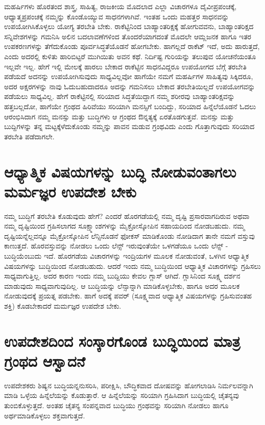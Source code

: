 ಮಹರ್ಷಿಗಳು ಹೊರತಂದ ಶಾಸ್ತ್ರ, ಸಾಹಿತ್ಯ, ರಾಜಕೀಯ ಮೊದಲಾದ ಎಲ್ಲಾ ವಿಚಾರಗಳೂ ದೈವೀಪ್ರಪಂಚಕ್ಕೆ, ಆಧ್ಯಾತ್ಮಪ್ರಪಂಚಕ್ಕೆ ನಮ್ಮನ್ನು ಕೊಂಡೊಯ್ಯುವ ಸಾಧನಗಳಾಗಿವೆ. ಇಂತಹ ಒಂದು ಮಹತ್ತರ ಸಾಧನವನ್ನು ಉಪಯೋಗಿಸಿಕೊಳ್ಳಲು ಯೋಗ್ಯ ತರಬೇತಿ ಬೇಕು. ರಾಕೆಟ್ಟಿನಿಂದ ಬಾಹ್ಯಾಂತರಿಕ್ಷಕ್ಕೆ ಹೋಗುವವನು, ಬಾಹ್ಯಾಂತರಿಕ್ಷದ ಸನ್ನಿವೇಶಗಳನ್ನು ಗಮನಿಸಿ ಅಲಿನ ಬದಲಾವಣೆಗಳಿಂದ ತೊಂದರೆಯಾಗದಂತೆ ಮೊದಲೇ ಆಮ್ಲಜನಕ ಹಾಗೂ ಇತರ ಉಪಕರಣಗಳನ್ನು ತೆಗೆದುಕೊಂಡು ಪೂರ್ವಸಿದ್ಧತೆಯೊಡನೆ ಹೋಗಬೇಕು. ಹಾಗಲ್ಲದೆ ರಾಕೆಟ್ ಇದೆ, ಅದು ಹಾರುತ್ತದೆ, ಎಂದು ಅದರಲ್ಲಿ ಕುಳಿತು ಹಾರಿಬಿಟ್ಟರೆ ಮುಗಿಯಿತು ಅವನ ಕಥೆ. ನಿರ್ದಿಷ್ಟ ಗುರಿಯನ್ನು ತಲುಪುವ ಯೋಚನೆಯಂತೂ ಇಲ್ಲವೇ ಇಲ್ಲ. ಹೇಗೆ ಇಲ್ಲಿ ಮೇಲಕ್ಕೆ ಹಾರಲು ಬೇಕಾದ ರಾಕೆಟ್ಟಿನ ಸಾಧನವಿದ್ದರೂ ಉಪಯೋಗದ ಬೆಗ್ಗೆ ತರಬೇತಿ ಪಡೆಯದೆ ಅದನನ್ನು ಉಪಯೋಗಿಸುವುದು ಸಾಧ್ಯವಿಲ್ಲವೋ ಹಾಗೆಯೇ ನಮಗೆ ಮಹರ್ಷಿಗಳ ಸಾಹಿತ್ಯವು ಸಿಕ್ಕಿದರೂ, ಅದರ ಅಕ್ಷರಗಳನ್ನು ನಾವು ಓದುಬಹುದಾದರೂ ಅದನ್ನು ಗಮನಿಸಲು ಬೇಕಾದ ತರಬೇತಿಯಿಲ್ಲದೆ ಉಪಯೋಗವನ್ನು ಪಡೆಯಲು ಸಾಧ್ಯವಿಲ್ಲ. ಹೇಗೆ ರಾಕೆಟ್ಟಿನಲ್ಲಿ ಸರಿಯಾದ ಸಿದ್ಧತೆಯಿದ್ದಾಗ ನಮ್ಮ ಶರೀರವು ಬಾಹ್ಯಾಂತರಿಕ್ಷವನ್ನು ಹತ್ತಬಲ್ಲದೋ, ಹಾಗೆಯೇ ಗ್ರಂಥದ ಹಿರಿವೆಯು ಸರಿಯಾಗಿ ಮನಸ್ಸಿಗೆ ಬಂದಿದ್ದು, ಸರಿಯಾದ ಹಿನ್ನೆಲೆಯೊಡನೆ ಓದಲು ಆರಂಭಿಸಿದಾಗ ನಮ್ಮ ಮನಸ್ಸು ಮತ್ತು ಬುದ್ಧಿಗಳು ಆ ಗ್ರಂಥದ ಔನ್ನತ್ಯಕ್ಕೆ ಏರತೊಡಗುತ್ತವೆ. ಮನಸ್ಸು ಮತ್ತು ಬುದ್ದಿಗಳನ್ನು ತನ್ನ ಮಟ್ಟಕ್ಕೆಳೆದುಕೊಂಡು ನಮ್ಮನ್ನು  ಪಾವನ ಮಡುವ ಗ್ರಂಥವಿದು ಎಂದು ಗೊತ್ತಾಗುವುದು ಸರಿಯಾದ ತರಬೇತಿ ಪಡೆದಾಗಲೇ. 

\section*{ಆಧ್ಯಾತ್ಮಿಕ ವಿಷಯಗಳನ್ನು ಬುದ್ಧಿ ನೋಡುವಂತಾಗಲು ಮರ್ಮಜ್ಞರ ಉಪದೇಶ ಬೇಕು}

ನಮ್ಮ ಬುದ್ಧಿಗೆ ತರಬೇತಿ ಕೊಡುವುದು ಹೇಗೆ? ಎಂದರೆ ಹೊರಗಡೆಯಲ್ಲಿ ನಮ್ಮ ದೃಷ್ಟಿ ಪ್ರಸಾರವಾಗದಿರುವ ಅಥವಾ ನಮ್ಮ ದೃಷ್ಟಿಯಿಂದ ಗ್ರಹಿಸಲಾಗದ ಸೂಕ್ಷ್ಮಾಂಶಗಳನ್ನು ಮೈಕ್ರೋಸ್ಕೋಪಿನ ಸಹಾಯದಿಂದ ನೋಡಬಹುದು. ನಮ್ಮ ದೃಷ್ಟಿಯನ್ನೆಲ್ಲವನ್ನೂ ಮೈಕ್ರೋಸ್ಕೋಪಿನ ಲೆನ್ಸಿನೊಡನೆ ಫೋಕಸ್ ಮಾಡಿಕೊಂಡು ನೋಡಿದಾಗ ತಾನೇ ನಮಗೆ ವಸ್ತುವು ಕಾಣುತ್ತದೆ. ಹೊರವಸ್ತುವನ್ನು ನೋಡಲು ಒಂದು ಲೆನ್ಸ್ ಇರುವುಂತೆಯೇ ಒಳಗಡೆಯೂ ಒಂದು ಲೆನ್ಸ್ - ಬುದ್ಧಿಯೆಂಬುದು ಇದೆ. ಹೊರಗಡೆಯ ವಿಚಾರಗಳನ್ನು ಇಂದ್ರಿಯಗಳ ಮೂಲಕ ನೋಡುವಂತೆ, ಒಳಗಿನ ಆಧ್ಯಾತ್ಮಿಕ ವಿಷಯಗಳನ್ನು ಬುದ್ಧಿಯಿಂದ ನೋಡಬಹುದು. ಆದರೆ ಇಂದು ನಮ್ಮ ಬುದ್ಧಿಯಿಂದ ಆಧ್ಯಾತ್ಮಿಕ ವಿಚಾರಗಳನ್ನು ಗ್ರಹಿಸಲು ಸಾಧ್ಯವಾಗುತ್ತಿಲ್ಲ. ಅದರ ಕಾರಣ ಇಂದು ನಮ್ಮ ಬುದ್ದಿಯು ಕೇವಲ ಗ್ಲಾಸ್ ಆಗಿದೆ. ಗ್ಲಾಸಿನಿಂದ ಸೂಕ್ಷ್ಮ ದರ್ಶನ ಮಾಡುವುದು ಸಾಧ್ಯವಾಗುವುದಿಲ್ಲ. ಆ ಬುದ್ಧಿಯನ್ನು ಲೆನ್ಸಾನ್ನಾಗಿ ಮಾಡಿಕೊಳ್ಳಬೇಕು, ಹಾಗೂ ಅದರ ಮೂಲಕ ನೋಡುವುದಕ್ಕೆ ಪ್ರಯತ್ನ ಪಡಬೇಕು. ಹಾಗೆ ಅದಕ್ಕೆ ಪವರ್ (ಸೂಕ್ಷ್ಮವಾದ ಆಧ್ಯಾತ್ಮಿಕ ವಿಷಯಗಳನ್ನು ಗ್ರಹಿಸುವಂತಹ ಶಕ್ತಿ) ಕೊಡಬೇಕಾದರೆ ಮರ್ಮಜ್ಞರ ಉಪದೇಶ ಬೇಕು. 

\section*{ಉಪದೇಶದಿಂದ ಸಂಸ್ಕಾರಗೊಂಡ ಬುದ್ಧಿಯಿಂದ ಮಾತ್ರ ಗ್ರಂಥದ ಆಸ್ವಾದನೆ}

ಉಪದೇಶಕರು ಶಿಷ್ಯನ ಬುದ್ಧಿಯನ್ನನುಸರಿಸಿ, ಪರೀಕ್ಷಿಸಿ, ಬೌದ್ಧಿಕವಾದ ದೋಷವನ್ನು ಹೋಗಲಾಡಿಸಿ ನಿರ್ಮಲವನ್ನಾಗಿ ಮಾಡಿ ಒಳ್ಳೆಯ ಹಿನ್ನೆಲೆಯನ್ನು ಕೊಡುತ್ತಾರೆ. ಆ ಹಿನ್ನೆಲೆಯನ್ನು ಸರಿಯಾಗಿ ಗ್ರಹಿಸಿದಾಗ ಬುದ್ಧಿಯಲ್ಲಿ ಚೈತನ್ಯವು ತುಂಬಿಕೊಳ್ಳುತ್ತದೆ. ಅಂತಹ ಚೈತನ್ಯ ಸಂಪನ್ನವಾದ ಬುದ್ಧಿಯು ಗ್ರಂಥವನ್ನು ಸರಿಯಾಗಿ ನೋಡಲು ಹಾಗೂ ಅರ್ಥಮಾಡಿಕೊಳ್ಳಲು ಶಕ್ತವಾಗುತ್ತದೆ. 

